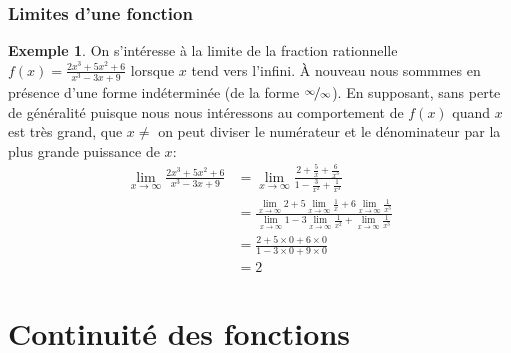 \documentclass[10pt,notheorems]{beamer}
\theoremstyle{plain}
\theoremstyle{definition} %
\newtheorem{example}{Exemple}
\begin{document}
\begin{frame}
  \frametitle{Limites d'une fonction}

  \begin{example}
    On s'intéresse à la limite de la fraction rationnelle  $f(x) = \frac{2x^3+5x^2+6}{x^3-3x+9}$ lorsque $x$ tend vers l'infini. À nouveau nous sommmes en présence d'une forme indéterminée (de la forme $\nicefrac{\infty}{\infty}$). En supposant, sans perte de généralité puisque nous nous intéressons au comportement de $f(x)$ quand $x$ est très grand, que $x\neq$ on peut diviser le numérateur et le dénominateur par la plus grande puissance de $x$:
    \[
      \begin{split}
        \lim_{x\rightarrow \infty}\frac{2x^3+5x^2+6}{x^3-3x+9} &= \lim_{x\rightarrow \infty}\frac{2+\frac{5}{x}+\frac{6}{x^3}}{1-\frac{3}{x^2}+\frac{1}{x^3}}\\
        &= \frac{ \lim_{x\rightarrow \infty}2+ 5\lim_{x\rightarrow \infty}\frac{1}{x}+6\lim_{x\rightarrow \infty}\frac{1}{x^3}}{\lim_{x\rightarrow \infty} 1-3\lim_{x\rightarrow \infty}\frac{1}{x^2}+\lim_{x\rightarrow \infty}\frac{1}{x^3}}\\
        &= \frac{2+5\times 0 + 6\times 0}{1-3\times 0 + 9\times 0}\\
        &= 2
      \end{split}
    \]

  \end{example}

\end{frame}

\section{Continuité des fonctions}
\end{document}
